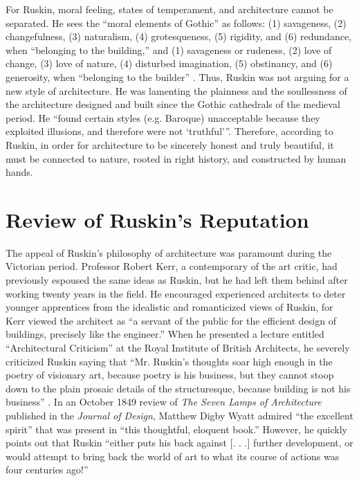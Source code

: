For Ruskin, moral feeling, states of temperament, and architecture
cannot be separated.  He sees the ``moral elements of Gothic'' as
follows: (1) savageness, (2) changefulness, (3) naturalism, (4)
grotesqueness, (5) rigidity, and (6) redundance, when “belonging to the
building,” and (1) savageness or rudeness, (2) love of change, (3) love
of nature, (4) disturbed imagination, (5) obstinancy, and (6)
generosity, when “belonging to the builder” \citep[][p.~155]{ruskin1885}
.  Thus, Ruskin was not arguing for a new style of architecture. 
He was lamenting the plainness and the soullessness of the architecture
designed and built since the Gothic cathedrals of the medieval period. 
He “found certain
styles (e.g. Baroque) unacceptable because they exploited illusions,
and therefore were not `truthful'”\citep[][p.~669]{curl2006}.
Therefore, according to Ruskin, in order for architecture
to be sincerely honest and truly beautiful, it must be connected to
nature, rooted in right history, and constructed by human hands.  

\section{Review of Ruskin's Reputation}


The appeal of Ruskin’s philosophy of architecture was paramount during
the Victorian period.  Professor Robert Kerr, a contemporary of the art
critic, had previously espoused the same ideas as Ruskin, but he had
left them behind after working twenty years in the field.  He
encouraged experienced architects to deter younger apprentices from the
idealistic and romanticized views of Ruskin, for Kerr viewed the
architect as “a servant of the public for the efficient design of
buildings, precisely like the engineer.”  When he presented a lecture
entitled ``Architectural Criticism'' at the
Royal Institute of British Architects, he severely criticized Ruskin
saying that “Mr. Ruskin's thoughts soar high enough in
the poetry of visionary art, because poetry is his business, but they
cannot stoop down to the plain prosaic details of the structuresque,
because building is not his business” \citep[][pp.~259--260]{collins1998}.  In an
October 1849 review of \textit{The Seven Lamps of Architecture
}published in the \textit{Journal of Design}, Matthew Digby Wyatt
admired “the excellent spirit” that was present in “this thoughtful,
eloquent book.”  However, he quickly points out that Ruskin “either
puts his back against  [. . .] further development, or would attempt to
bring back the world of art to what its course of actions was four
centuries ago!”\citep[][pp.~121,~438]{mallgrave2009}

